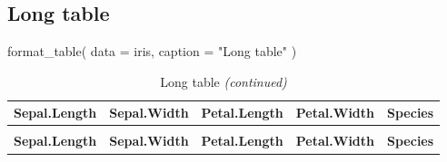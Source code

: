 \documentclass[
]{article}
\newenvironment{Shaded}{\begin{snugshade}}{\end{snugshade}}
\newcommand{\AttributeTok}[1]{\textcolor[rgb]{0.40,0.45,0.13}{#1}}
\newcommand{\FunctionTok}[1]{\textcolor[rgb]{0.28,0.35,0.67}{#1}}
\newcommand{\NormalTok}[1]{\textcolor[rgb]{0.00,0.23,0.31}{#1}}
\newcommand{\StringTok}[1]{\textcolor[rgb]{0.13,0.47,0.30}{#1}}
\begin{document}
\hypertarget{long-table}{%
\subsection{Long table}\label{long-table}}

\begin{Shaded}
\begin{Highlighting}[]
\FunctionTok{format\_table}\NormalTok{(}
  \AttributeTok{data =}\NormalTok{ iris,}
  \AttributeTok{caption =} \StringTok{"Long table"}
\NormalTok{  )}
\end{Highlighting}
\end{Shaded}

\begingroup\fontsize{15}{17}\selectfont

\begin{longtable}[t]{lllll}
\caption{Long table}\\
\toprule
\textbf{Sepal.Length} & \textbf{Sepal.Width} & \textbf{Petal.Length} & \textbf{Petal.Width} & \textbf{Species}\\
\midrule
\endfirsthead
\caption[]{Long table \textit{(continued)}}\\
\toprule
\textbf{Sepal.Length} & \textbf{Sepal.Width} & \textbf{Petal.Length} & \textbf{Petal.Width} & \textbf{Species}\\
\midrule
\endhead


\end{longtable}
\end{document}
